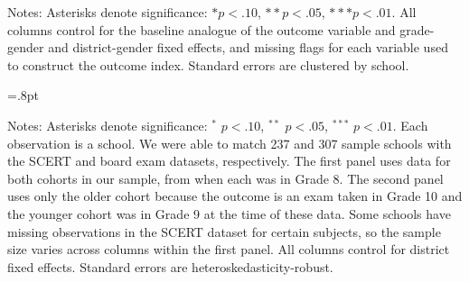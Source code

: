\documentclass[letterpaper,12pt,pdftex]{article}
\begin{document}
\clearpage
\newpage

\begin{table}
\tabcolsep=2.8pt
		\caption{Heterogeneity by binary measure of baseline parent attitudes (EL1)}
		\label{tab_el1_heterog_patt_abovemed}
		\begin{center}
			\small
		
		\end{center}
\flushleft \footnotesize {Notes: Asterisks denote significance: $* p < .10$, $** p < .05$, $*** p < .01$. All columns control for the baseline analogue of the outcome variable and grade-gender and district-gender fixed effects, and missing flags for each variable used to construct the outcome index. Standard errors are clustered by school.}
\end{table}

\clearpage
\newpage

\begin{table}
	\tabcolsep=.8pt
	\caption{Treatment effects on school performance (EL1)}
	\label{tab_school_performance}
	\begin{threeparttable}
		\centering
		\vspace{1cm}
		{\captionsetup{justification=raggedright,singlelinecheck=false}
			\small {
				\flushleft \hspace{1cm} 
				\vspace{2cm}
				\flushleft \hspace{1cm} 
			}
		}
		
		\vspace{0.5cm}
		\flushleft \footnotesize {Notes: Asterisks denote significance: $^*$ $p < .10$, $^{**}$ $p < .05$, $^{***}$ $p < .01$. Each observation is a school. We were able to match 237 and 307 sample schools with the SCERT and board exam datasets, respectively. The first panel uses data for both cohorts in our sample, from when each was in Grade 8. The second panel uses only the older cohort because the outcome is an exam taken in Grade 10 and the younger cohort was in Grade 9 at the time of these data. Some schools have missing observations in the SCERT dataset for certain subjects, so the sample size varies across columns within the first panel. All columns control for district fixed effects. Standard errors are heteroskedasticity-robust.}
	\end{threeparttable}
\end{table}
\end{document}
